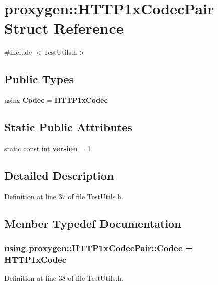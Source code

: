 \section{proxygen\+:\+:H\+T\+T\+P1x\+Codec\+Pair Struct Reference}
\label{structproxygen_1_1HTTP1xCodecPair}


{\ttfamily \#include $<$Test\+Utils.\+h$>$}

\subsection*{Public Types}
\begin{DoxyCompactItemize}
\item 
using {\bf Codec} = {\bf H\+T\+T\+P1x\+Codec}
\end{DoxyCompactItemize}
\subsection*{Static Public Attributes}
\begin{DoxyCompactItemize}
\item 
static const int {\bf version} = 1
\end{DoxyCompactItemize}


\subsection{Detailed Description}


Definition at line 37 of file Test\+Utils.\+h.



\subsection{Member Typedef Documentation}
\subsubsection[{Codec}]{\setlength{\rightskip}{0pt plus 5cm}using {\bf proxygen\+::\+H\+T\+T\+P1x\+Codec\+Pair\+::\+Codec} =  {\bf H\+T\+T\+P1x\+Codec}}\label{structproxygen_1_1HTTP1xCodecPair_a6e7ae049a7e563e1f36055e8fe66023b}


Definition at line 38 of file Test\+Utils.\+h.



